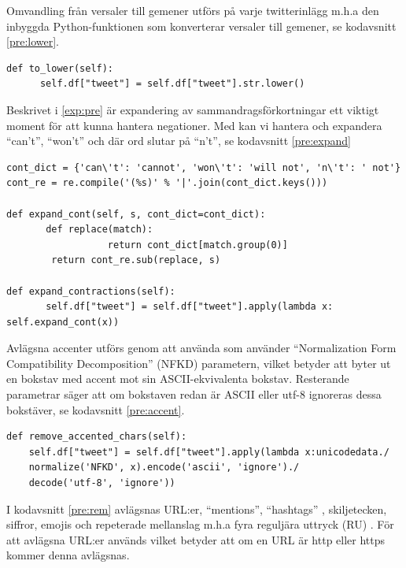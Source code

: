 \documentclass{kaumasters} %
\begin{document}
Omvandling från versaler till gemener utförs på varje twitterinlägg m.h.a den inbyggda Python-funktionen  som konverterar versaler till gemener, se kodavsnitt \ref{pre:lower}.
\begin{lstlisting}[style=mypython,caption={Funktion för att omvandla versaler till gemener.},label=pre:lower]
def to_lower(self):
      self.df["tweet"] = self.df["tweet"].str.lower()
\end{lstlisting}

Beskrivet i \ref{exp:pre} är expandering av sammandragsförkortningar ett viktigt moment för att kunna hantera negationer. Med   kan vi hantera och expandera “can’t”, “won’t” och där ord slutar på “n’t”, se kodavsnitt \ref{pre:expand}
\begin{lstlisting}[style=mypython,caption={Kod för att expandera sammandragsförkortningar.},label=pre:expand]
cont_dict = {'can\'t': 'cannot', 'won\'t': 'will not', 'n\'t': ' not'}
cont_re = re.compile('(%s)' % '|'.join(cont_dict.keys()))

def expand_cont(self, s, cont_dict=cont_dict):
       def replace(match):
                  return cont_dict[match.group(0)]
        return cont_re.sub(replace, s)

def expand_contractions(self):
       self.df["tweet"] = self.df["tweet"].apply(lambda x: self.expand_cont(x))
\end{lstlisting}

Avlägsna accenter utförs genom att använda  \cite{impl:005} som använder “Normalization Form Compatibility Decomposition” (NFKD) parametern,  vilket betyder att  byter ut en bokstav med accent mot sin ASCII-ekvivalenta bokstav. Resterande parametrar säger att om bokstaven redan är ASCII eller utf-8 ignoreras dessa bokstäver, se kodavsnitt \ref{pre:accent}.
\begin{lstlisting}[style=mypython,caption={Funktion för att avlägsna accenter.},label=pre:accent]
def remove_accented_chars(self):
    self.df["tweet"] = self.df["tweet"].apply(lambda x:unicodedata./
    normalize('NFKD', x).encode('ascii', 'ignore')./
    decode('utf-8', 'ignore'))
\end{lstlisting}

I kodavsnitt \ref{pre:rem}  avlägsnas URL:er, “mentions”, “hashtags” , skiljetecken, siffror, emojis och repeterade mellanslag m.h.a fyra reguljära uttryck (RU) \cite{impl:003}. För att avlägsna URL:er används  vilket betyder att om en URL är http eller https kommer denna avlägsnas.
\end{document}
